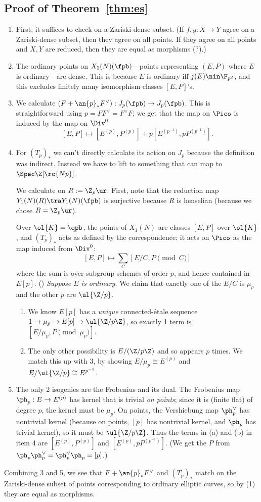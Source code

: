 \subsection{Proof of Theorem~\ref{thm:es}}
\begin{enumerate}
\item
First, it suffices to check on a Zariski-dense subset. (If $f,g:X\to Y$ agree on a Zariski-dense subset, then they agree on all points. If they agree on all points and $X,Y$ are reduced, then they are equal as morphisms (?).)
\item
The ordinary points on $X_1(N)(\fpb)$---points representing $(E,P)$ where $E$ is ordinary---are dense. This is because $E$ is ordinary iff $j(E)\nin \F_{p^2}$, and this excludes finitely many isomorphism classes $[E,P]$'s.
\item
We calculate $(F+\an{p}_* F^{\vee}):J_p(\fpb)\to J_p(\fpb)$. This is straightforward using $p=FF^{\vee}=F^{\vee}F$; we get that the map on $\Pico$ is induced by the map on $\Div^0$
\[
[E,P]\mapsto [E^{(p)},P^{(p)}]+p[E^{(p^{-1})},pP^{(p^{-1})}].
\]
\item 
For $(T_p)_*$ we can't directly calculate its action on $J_p$ because the definition was indirect. Instead we have to lift to something that can map to $\Spec\Z[\rc{Np}]$.

We calculate on $R:=\Z_p\ur$.  First, note that the reduction map $Y_1(N)(R)\tra Y_1(N)(\fpb)$ is surjective because $R$ is henselian (because we chose $R=\Z_p\ur$).

Over $\ol{K}=\qpb$, the points of $X_1(N)$ are classes $[E,P]$ over $\ol{K}$, and $(T_p)_*$ acts as defined by the correspondence: it acts on $\Pico$ as the map induced from $\Div^0$:
\[
[E,P]\mapsto \sum_C[E/C,P\pmod C]
\]
where the sum is over subgroup-schemes of order $p$, and hence contained in $E[p]$. () 
{\it Suppose $E$ is ordinary.}
We claim that exactly one of the $E/C$ is $\mu_p$ and the other $p$ are $\ul{\Z/p}$. 
\begin{enumerate}
\item
We know $E[p]$ has a {\it unique} connected-\'etale sequence $1\to \mu_p\to E[p] \to \ul{\Z/p\Z}$, so exactly 1 term is $[E/\mu_p,P\pmod{\mu_p}]$.
\item
The only other possibility is $E/(\Z/p\Z)$ and so appears $p$ times.
We match this up with 3, by showing $E/\mu_p\cong E^{(p)}$ and $E/\ul{\Z/p}\cong E^{p^{-1}}$.



\end{enumerate}
\item
The only 2 isogenies are the Frobenius and its dual. The Frobenius map $\ph_p:E\to E^{(p)}$ has kernel that is trivial {\it on points}; since it is (finite flat) of degree $p$, the kernel must be $\mu_p$. On points, the Vershiebung map $\ph_p^{\vee}$ has nontrivial kernel (because on points, $[p]$ has nontrivial kernel, and $\ph_p$ has trivial kernel), so it must be $\ul{\Z/p\Z}$. Thus the terms in (a) and (b) in item 4 are
$[E^{(p)},P^{(p)}]$ and $[E^{(p)},pP^{(p^{-1})}]$. (We get the $P$ from $\ph_p\ph_p^{\vee}=\ph_p^{\vee}\ph_p=[p]$.)
\end{enumerate}
Combining 3 and 5, we see that $F+\an{p}_*F^{\vee}$ and $(T_p)_*$ match on the Zariski-dense subset of points corresponding to ordinary elliptic curves, so by (1) they are equal as morphisms.

%
 


